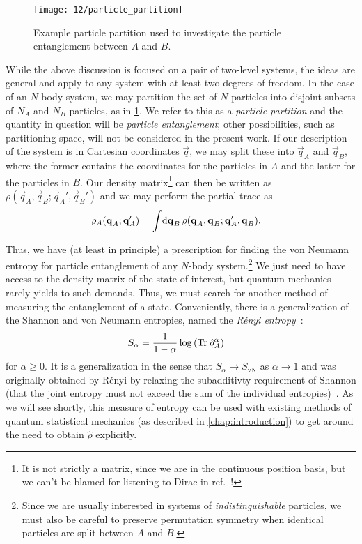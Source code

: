 \begin{figure}
	\centering
	\texttt{[image: 12/particle\_partition]}
	\caption[
		Example particle partition
	]{
		Example particle partition used to investigate the particle entanglement between $A$ and $B$.
	}
	\label{fig:particle-partition}
\end{figure}

While the above discussion is focused on a pair of two-level systems, the ideas are general and apply to any system with at least two degrees of freedom.
In the case of an $N$-body system, we may partition the set of $N$ particles into disjoint subsets of $N_A$ and $N_B$ particles, as in \cref{fig:particle-partition}.
We refer to this as a \emph{particle partition} and the quantity in question will be \emph{particle entanglement}; other possibilities, such as partitioning space, will not be considered in the present work.
If our description of the system is in Cartesian coordinates $\vec{q}$, we may split these into $\vec{q}_A$ and $\vec{q}_B$, where the former contains the coordinates for the particles in $A$ and the latter for the particles in $B$.
Our density matrix\footnote{
	It is not strictly a matrix, since we are in the continuous position basis, but we can't be blamed for listening to Dirac in ref.~\cite[69-70]{dirac1981principles}!
} can then be written as $\rho(\vec{q}_A, \vec{q}_B ; \vec{q}_A', \vec{q}_B')$ and we may perform the partial trace as
\begin{align}
	\rho_A(\vec{q}_A ; \vec{q}_A')
	&= \int\! \dif \vec{q}_B \, \rho(\vec{q}_A, \vec{q}_B ; \vec{q}_A', \vec{q}_B).
\end{align}

Thus, we have (at least in principle) a prescription for finding the von Neumann entropy for particle entanglement of any $N$-body system.\footnote{
	Since we are usually interested in systems of \emph{indistinguishable} particles, we must also be careful to preserve permutation symmetry when identical particles are split between $A$ and $B$.
}
We just need to have access to the density matrix of the state of interest, but quantum mechanics rarely yields to such demands.
Thus, we must search for another method of measuring the entanglement of a state.
Conveniently, there is a generalization of the Shannon and von Neumann entropies, named the \emph{Rényi entropy}~\cite{herdman2014path,renyi1961measures}:
\begin{align}
	S_\alpha
	&= \frac{1}{1 - \alpha} \log{\left( \operatorname{Tr}{\hat{\varrho}_A^\alpha} \right)}
\end{align}
for $\alpha \ge 0$.
It is a generalization in the sense that $S_\alpha \to S_\mathrm{vN}$ as $\alpha \to 1$ and was originally obtained by Rényi by relaxing the subadditivty requirement of Shannon (that the joint entropy must not exceed the sum of the individual entropies)~\cite{shannon1948mathematical,renyi1961measures}.
As we will see shortly, this measure of entropy can be used with existing methods of quantum statistical mechanics (as described in \cref{chap:introduction}) to get around the need to obtain $\hat{\rho}$ explicitly.





